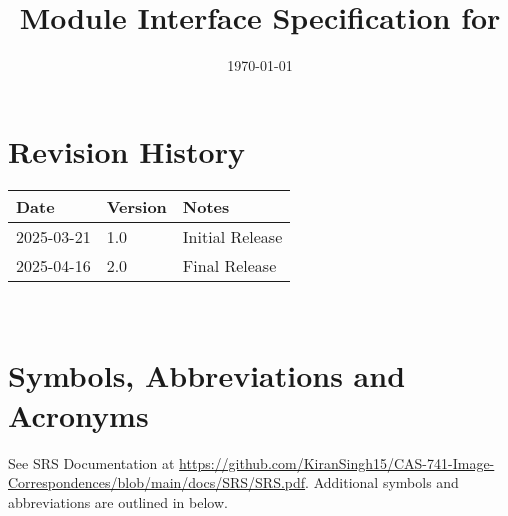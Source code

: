 \documentclass[12pt, titlepage]{article}
\begin{document}
\title{Module Interface Specification for \progname{}}

\author{\authname}

\date{\today}

\maketitle


\section{Revision History}

\begin{tabularx}{\textwidth}{p{3cm}p{2cm}X}
\toprule {\bf Date} & {\bf Version} & {\bf Notes}\\
\midrule
2025-03-21 & 1.0 & Initial Release\\
2025-04-16 & 2.0 & Final Release\\
\bottomrule
\end{tabularx}

~\newpage

\section{Symbols, Abbreviations and Acronyms}

See SRS Documentation at \url{https://github.com/KiranSingh15/CAS-741-Image-Correspondences/blob/main/docs/SRS/SRS.pdf}. Additional 
symbols and abbreviations are outlined in below.
\end{document}
